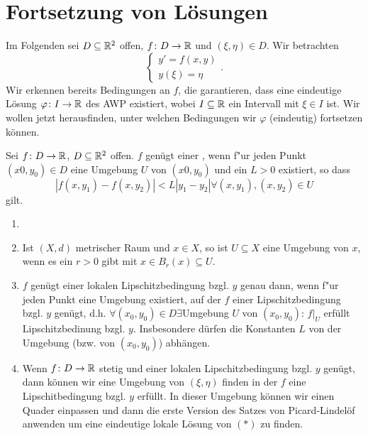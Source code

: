 \chapter{Fortsetzung von L\"osungen}
Im Folgenden sei $ D\subseteq\mathbb{R}^2 $ offen, $ f\colon D\rightarrow\mathbb{R} $ und $ (\xi,\eta)\in D $. Wir betrachten
\[ \begin{cases}
y'=f(x,y)\\y(\xi)=\eta
\end{cases}. \]
Wir erkennen bereits Bedingungen an $ f $, die garantieren, dass eine eindeutige L\"osung $ \varphi\colon I\rightarrow\mathbb{R} $ des AWP existiert, wobei $ I\subseteq\mathbb{R} $ ein Intervall mit $ \xi\in I $ ist. Wir wollen jetzt herausfinden, unter welchen Bedingungen wir $ \varphi $ (eindeutig) fortsetzen k\"onnen.
\begin{definition}
	Sei $ f\colon D\rightarrow\mathbb{R} $, $ D\subseteq\mathbb{R}^2 $ offen. $ f $ gen\"ugt einer , wenn f"ur jeden Punkt $ (x0,y_0)\in D $ eine Umgebung $ U $ von $ (x0,y_0) $ und ein $ L>0 $ existiert, so dass
	\[ |f(x,y_1)-f(x,y_2)|<L|y_1-y_2|\forall(x,y_1), (x,y_2)\in U \]
	gilt.
\end{definition}
\begin{bemerkung}
	\begin{enumerate}
		\item[]
		\item Ist $ (X,d) $ metrischer Raum und $ x\in X $, so ist $ U\subseteq X $ eine Umgebung von $ x $, wenn es ein $ r>0 $ gibt mit $ x\in B_r(x)\subseteq U $.
		\item $ f $ gen\"ugt einer lokalen Lipschitzbedingung bzgl. $ y $ genau dann, wenn f"ur jeden Punkt eine Umgebung existiert, auf der $ f $ einer Lipschitzbedingung bzgl. $ y $ gen\"ugt, d.h. $ \forall (x_0,y_0)\in D\exists $Umgebung $ U $ von $ (x_0,y_0) $: $ f|_U $ erf\"ullt Lipschitzbedinung bzgl. $ y $. Insbesondere d\"urfen die Konstanten $ L $ von der Umgebung (bzw. von $ (x_0,y_0) $) abh\"angen.
		\item Wenn $ f\colon D\rightarrow\mathbb{R} $ stetig und einer lokalen Lipschitzbedingung bzgl. $ y $ gen\"ugt, dann k\"onnen wir eine Umgebung von $ (\xi,\eta) $ finden in der $ f $ eine Lipschitbedingung bzgl. $ y $ erf\"ullt. In dieser Umgebung k\"onnen wir einen Quader einpassen und dann die erste Version des Satzes von Picard-Lindel\"of anwenden um eine eindeutige lokale L\"osung von $ (\ast) $ zu finden.
	\end{enumerate}
\end{bemerkung}
